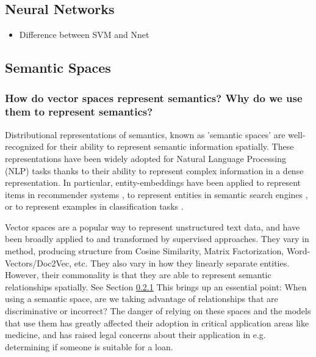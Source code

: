 \subsection{Neural Networks}
\begin{itemize}
	\item Difference between SVM and Nnet
\end{itemize}
\subsection{Semantic Spaces}\label{bg:SemanticSpaces}

\subsubsection{How do vector spaces represent semantics? Why do we use them to represent semantics?}\label{background:WhySpace}
Distributional representations of semantics, known as 'semantic spaces' are well-recognized for their ability to represent semantic information spatially. These representations have been widely adopted for Natural Language Processing (NLP) tasks %
thanks to their ability to represent complex information in a dense representation. In particular, entity-embeddings have been applied  to represent items in recommender systems \cite{Vasile:2016:MPE:2959100.2959160,liang2016factorization,van2016learning}, to represent entities in semantic search engines \cite{DBLP:conf/sigir/JameelBS17,van2017structural}, or to represent examples in classification tasks \cite{DBLP:conf/iccv/DemirelCI17}. %

Vector spaces are a popular way to represent unstructured text data, and have been broadly applied to and transformed by supervised approaches. They vary in method, producing structure from Cosine Similarity, Matrix Factorization, Word-Vectors/Doc2Vec, etc. %
They also vary in how they linearly separate entities. %
However, their commonality is that they are able to represent semantic relationships spatially. %
See Section \ref{background:WhySpace}
This brings up an essential point: When using a semantic space, are we taking advantage of relationships that are discriminative or incorrect? The danger of relying on these spaces and the models that use them has greatly affected their adoption in critical application areas like medicine, %
and has raised legal concerns about their application in e.g. determining if someone is suitable for a loan. 

